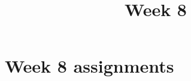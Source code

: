 \documentclass{xourse}
\title{Week 8}
\begin{document}
\begin{abstract}
\end{abstract}
\maketitle

\part{Week 8 assignments}
\end{document}
